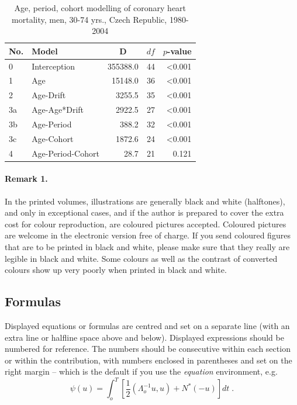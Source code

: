 \documentclass[a4paper,10pt,twocolumn,twoside,openright]{article}
\begin{document}
\begin{table}[h]
\centering
\caption{Age, period, cohort modelling of coronary heart mortality, men, 30-74 yrs., Czech Republic, 1980-2004}\label{ex_tab}
\begin{tabular}{|l||lrcr|}
\hline No. & Model & \multicolumn{1}{c}{D} & $df$ & $p$-value \\ 
\hline \hline 0 & Interception & 355388.0 & 44 & <0.001 \\ 
\hline 1 & Age & 15148.0 & 36 & <0.001 \\ 
\hline 2 & Age-Drift & 3255.5 & 35 & <0.001 \\ 
\hline 3a & Age-Age*Drift & 2922.5 & 27 & <0.001 \\ 
\hline 3b & Age-Period & 388.2 & 32 & <0.001 \\ 
\hline 3c & Age-Cohort & 1872.6 & 24 & <0.001 \\ 
\hline 4 & Age-Period-Cohort & 28.7 & 21 & 0.121 \\ 
\hline 
\end{tabular} 
\end{table}


\paragraph{Remark 1.}

In the printed volumes, illustrations are generally black and white (halftones), and only in exceptional cases, and if the author is prepared to cover the extra cost for colour reproduction, are coloured pictures accepted. Coloured pictures are welcome in the electronic version free of charge. If you send coloured figures that are to be printed in black and white, please make sure that they really are legible in black and white. Some colours as well as the contrast of converted colours show up very poorly when printed in black and white.


\subsection{Formulas}

Displayed equations or formulas are centred and set on a separate line (with an extra line or halfline space above and below). Displayed expressions should be numbered for reference. The numbers should be consecutive within each section or within the contribution, with numbers enclosed in parentheses and set on the right margin --  which is the default if you use the \emph{equation} environment, e.g.
\begin{equation}
  \psi (u) = \int_{o}^{T} \left[\frac{1}{2}
  \left(\Lambda_{o}^{-1} u,u\right) + N^{\ast} (-u)\right] dt \;  .
\end{equation}
\end{document}
